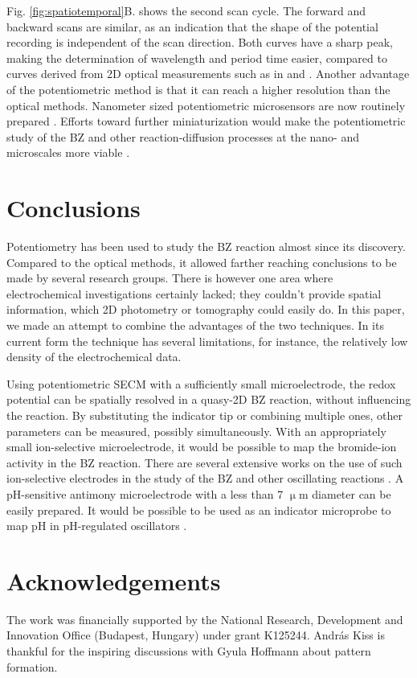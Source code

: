 \documentclass[3p, twocolumn]{elsarticle}
\begin{document}
Fig. \ref{fig:spatiotemporal}B. shows the second scan cycle.
The forward and backward scans are similar, as an indication that the shape of the potential recording is independent of the scan direction.
Both curves have a sharp peak, making the determination of wavelength and period time easier, compared to curves derived from 2D optical measurements such as in \cite{muller1985structure} and \cite{nagy1990experimental}.
Another advantage of the potentiometric method is that it can reach a higher resolution than the optical methods.
Nanometer sized potentiometric microsensors are now routinely prepared \cite{elsamadisi2010polished}.
Efforts toward further miniaturization would make the potentiometric study of the BZ and other reaction-diffusion processes at the nano- and microscales more viable \cite{epstein2016reaction}.

\section{Conclusions}
Potentiometry has been used to study the BZ reaction almost since its discovery.
Compared to the optical methods, it allowed farther reaching conclusions to be made by several research groups.
There is however one area where electrochemical investigations certainly lacked; they couldn't provide spatial information, which 2D photometry or tomography could easily do.
In this paper, we made an attempt to combine the advantages of the two techniques.
In its current form the technique has several limitations, for instance, the relatively low density of the electrochemical data.

Using potentiometric SECM with a sufficiently small microelectrode, the redox potential can be spatially resolved in a quasy-2D BZ reaction, without influencing the reaction.
By substituting the indicator tip or combining multiple ones, other parameters can be measured, possibly simultaneously.
With an appropriately small ion-selective microelectrode, it would be possible to map the bromide-ion activity in the BZ reaction.
There are several extensive works on the use of such ion-selective electrodes in the study of the BZ and other oscillating reactions \cite{noszticzius1982use, noszticzius1983use}.
A pH-sensitive antimony microelectrode with a less than 7 $\upmu$m diameter can be easily prepared.
It would be possible to be used as an indicator microprobe to map pH in pH-regulated oscillators \cite{orban2015ph}.

\section*{Acknowledgements}
The work was financially supported by the National Research, Development and Innovation Office (Budapest, Hungary) under grant K125244.
András Kiss is thankful for the inspiring discussions with Gyula Hoffmann about pattern formation.

{}

\end{document}
